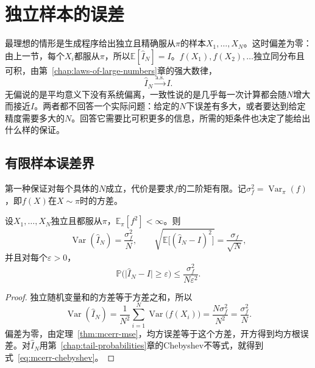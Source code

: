 \section{独立样本的误差}
\label{sec:mcerr-iid}

最理想的情形是生成程序给出独立且精确服从$\pi$的样本$X_1,\dots,X_N$。这时偏差为零：由上一节，每个$X_i$都服从$\pi$，所以$\mathbb{E}[\hat{I}_N]=I$。$f(X_1),f(X_2),\dots$独立同分布且可积，由第~\ref{chap:laws-of-large-numbers}章的强大数律，
\begin{equation}
 \hat{I}_N\xrightarrow{\mathrm{a.s.}}I .
 \label{eq:mcerr-consistency}
\end{equation}
无偏说的是平均意义下没有系统偏离，一致性说的是几乎每一次计算都会随$N$增大而接近$I$。两者都不回答一个实际问题：给定的$N$下误差有多大，或者要达到给定精度需要多大的$N$。回答它需要比可积更多的信息，所需的矩条件也决定了能给出什么样的保证。

\subsection{有限样本误差界}
\label{sec:mcerr-finite-bound}

第一种保证对每个具体的$N$成立，代价是要求$f$的二阶矩有限。记$\sigma_f^{2}=\operatorname{Var}_{\pi}(f)$，即$f(X)$在$X\sim\pi$时的方差。

\begin{theorem}[独立样本平均的误差界]
\label{thm:mcerr-iid-bound}
设$X_1,\dots,X_N$独立且都服从$\pi$，$\mathbb{E}_{\pi}[f^{2}]<\infty$。则
\begin{equation}
 \operatorname{Var}(\hat{I}_N)=\frac{\sigma_f^{2}}{N},\qquad \sqrt{\mathbb{E}\bigl[(\hat{I}_N-I)^{2}\bigr]}=\frac{\sigma_f}{\sqrt{N}} ,
 \label{eq:mcerr-iid-var}
\end{equation}
并且对每个$\varepsilon>0$，
\begin{equation}
 \mathbb{P}\bigl(\lvert\hat{I}_N-I\rvert\geq\varepsilon\bigr)\leq\frac{\sigma_f^{2}}{N\varepsilon^{2}} .
 \label{eq:mcerr-chebyshev}
\end{equation}
\end{theorem}

\begin{proof}
独立随机变量和的方差等于方差之和，所以
\[
 \operatorname{Var}(\hat{I}_N)=\frac{1}{N^{2}}\sum_{i=1}^{N}\operatorname{Var}\bigl(f(X_i)\bigr)=\frac{N\sigma_f^{2}}{N^{2}}=\frac{\sigma_f^{2}}{N} .
\]
偏差为零，由定理~\ref{thm:mcerr-mse}，均方误差等于这个方差，开方得到均方根误差。对$\hat{I}_N$用第~\ref{chap:tail-probabilities}章的Chebyshev不等式，就得到式~\eqref{eq:mcerr-chebyshev}。
\end{proof}

